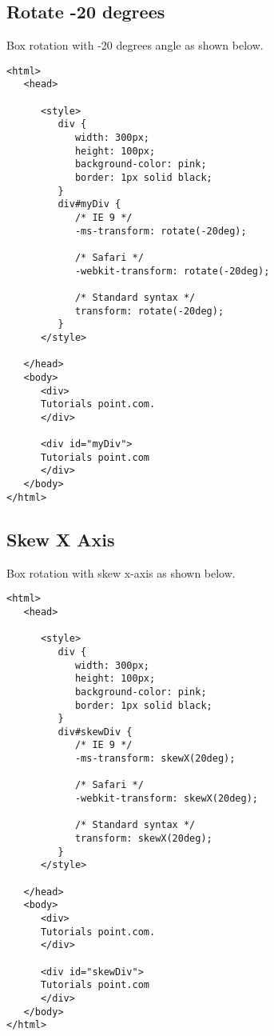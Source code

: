 \documentclass[a4paper,oneside]{book}
\numberwithin{equation}{chapter}
\begin{document}
\subsection{Rotate -20 degrees}
Box rotation with -20 degrees angle as shown below.
\begin{verbatim}
<html>
   <head>
   
      <style>
         div {
            width: 300px;
            height: 100px;
            background-color: pink;
            border: 1px solid black;
         }
         div#myDiv {
            /* IE 9 */
            -ms-transform: rotate(-20deg); 
         
            /* Safari */
            -webkit-transform: rotate(-20deg);
         
            /* Standard syntax */	
            transform: rotate(-20deg);
         }
      </style>
      
   </head>
   <body>
      <div>
      Tutorials point.com.
      </div>
      
      <div id="myDiv">
      Tutorials point.com
      </div>
   </body>
</html>
\end{verbatim}
\subsection{Skew X Axis}
Box rotation with skew x-axis as shown below.
\begin{verbatim}
<html>
   <head>
   
      <style>
         div {
            width: 300px;
            height: 100px;
            background-color: pink;
            border: 1px solid black;
         }
         div#skewDiv {
            /* IE 9 */
            -ms-transform: skewX(20deg); 
            
            /* Safari */
            -webkit-transform: skewX(20deg);
            
            /* Standard syntax */	
            transform: skewX(20deg);
         }
      </style>
      
   </head>
   <body>
      <div>
      Tutorials point.com.
      </div>
      
      <div id="skewDiv">
      Tutorials point.com
      </div>
   </body>
</html>
\end{verbatim}
\end{document}
